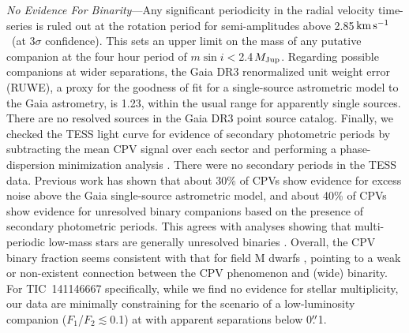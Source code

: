 \documentclass{nature3}
\newcommand{\farcs}{\mbox{\ensuremath{.\!\!^{\prime\prime}}}}%
\newcommand{\kms}{\ensuremath{\rm km\,s^{-1}}}
\begin{document}
\begin{methods}

{\it No Evidence For Binarity}---Any significant periodicity in the
radial velocity time-series is ruled out at the rotation period for
semi-amplitudes above 2.85\,\kms\ (at 3$\sigma$ confidence).  This sets
an upper limit on the mass of any putative companion at the four hour
period of $m \sin i $$<$2.4\,$M_{\rm Jup}$.  Regarding possible
companions at wider separations, the Gaia DR3 renormalized unit weight
error (RUWE), a proxy for the goodness of fit for a single-source
astrometric model to the Gaia astrometry, is 1.23, within the usual
range for apparently single sources.  There are no resolved sources in
the Gaia DR3 point source catalog.  Finally, we checked the TESS light
curve for evidence of secondary photometric periods by subtracting the
mean CPV signal over each sector and performing a phase-dispersion
minimization analysis \cite{Stellingwerf1978,2021zndo...1011188B}.
There were no secondary periods in the TESS data.  Previous work
\cite{Bouma2024} has shown that about 30\% of CPVs show evidence for
excess noise above the Gaia single-source astrometric model, and about
40\% of CPVs show evidence for unresolved binary companions based on the
presence of secondary photometric periods.  This agrees with analyses
showing that multi-periodic low-mass stars are generally unresolved
binaries \cite{Tokovinin2018}.  Overall, the CPV binary fraction seems
consistent with that for field M dwarfs \cite{Winters2019}, pointing to
a weak or non-existent connection between the CPV phenomenon and
(wide) binarity.  For TIC~141146667 specifically, while we find no evidence for
stellar multiplicity, our data are minimally constraining for the
scenario of a low-luminosity companion ($F_1$/$F_2$$\lesssim$0.1) at
with apparent separations below 0$\farcs$1.



\end{methods}
\end{document}
